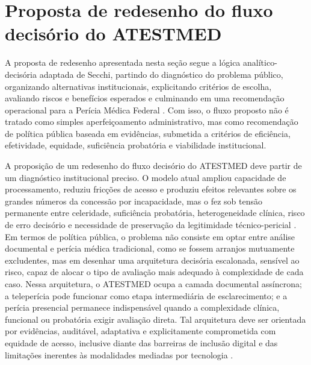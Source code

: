 \documentclass[12pt,a4paper]{article}
\begin{document}
\section{Proposta de redesenho do fluxo decisório do ATESTMED}
\label{sec:orgc4aa15a}
A proposta de redesenho apresentada nesta seção segue a lógica analítico-decisória adaptada de Secchi, partindo do diagnóstico do problema público, organizando alternativas institucionais, explicitando critérios de escolha, avaliando riscos e benefícios esperados e culminando em uma recomendação operacional para a Perícia Médica Federal \parencite{secchi2020analisedepoliticaspublicas}. Com isso, o fluxo proposto não é tratado como simples aperfeiçoamento administrativo, mas como recomendação de política pública baseada em evidências, submetida a critérios de eficiência, efetividade, equidade, suficiência probatória e viabilidade institucional.

A proposição de um redesenho do fluxo decisório do ATESTMED deve partir de um diagnóstico institucional preciso. O modelo atual ampliou capacidade de processamento, reduziu fricções de acesso e produziu efeitos relevantes sobre os grandes números da concessão por incapacidade, mas o fez sob tensão permanente entre celeridade, suficiência probatória, heterogeneidade clínica, risco de erro decisório e necessidade de preservação da legitimidade técnico-pericial \parencite{soares20241031t0000000000asistematicadoatestmednaconcessa}. Em termos de política pública, o problema não consiste em optar entre análise documental e perícia médica tradicional, como se fossem arranjos mutuamente excludentes, mas em desenhar uma arquitetura decisória escalonada, sensível ao risco, capaz de alocar o tipo de avaliação mais adequado à complexidade de cada caso. Nessa arquitetura, o ATESTMED ocupa a camada documental assíncrona; a teleperícia pode funcionar como etapa intermediária de esclarecimento; e a perícia presencial permanece indispensável quando a complexidade clínica, funcional ou probatória exigir avaliação direta. Tal arquitetura deve ser orientada por evidências, auditável, adaptativa e explicitamente comprometida com equidade de acesso, inclusive diante das barreiras de inclusão digital e das limitações inerentes às modalidades mediadas por tecnologia \parencite{ftouni2022challengesoftelemedicineduringthecovid19pandemica, albasheer2026telemedicineutilizationanddigitalinclusionamongpe}.
\end{document}

